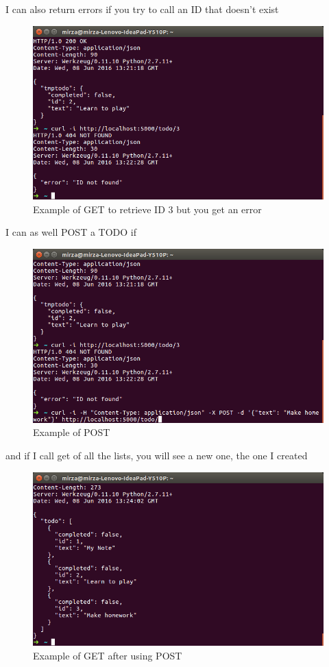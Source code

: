 \documentclass{sig-alternate-05-2015}
\begin{document}
I can also return errors if you try to call an ID that doesn't exist
\begin{figure}[H]
  \centering
  \includegraphics[scale=0.35]{GETIDnotfound.png}
  \caption{Example of GET to retrieve ID 3 but you get an error}\label{GETIDnotfound}
\end{figure}
I can as well POST a TODO if
\begin{figure}[H]
  \centering
  \includegraphics[scale=0.35]{POST.png}
  \caption{Example of POST}\label{POST}
\end{figure}
and if I call get of all the lists, you will see a new one, the one I created
\begin{figure}[H]
  \centering
  \includegraphics[scale=0.35]{GETafterPOST.png}
  \caption{Example of GET after using POST}\label{GETafterPOST}
\end{figure}
\end{document}
